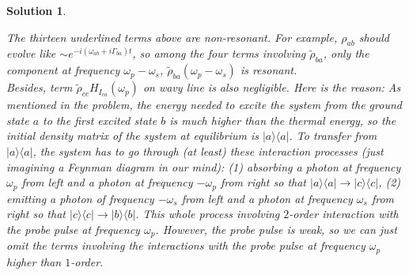 \documentclass[UTF8,10pt,a4paper]{article}
\theoremstyle{Problem}
\theoremstyle{Solution}
\newtheorem*{sol}{Solution}
\begin{document}
\begin{sol}
\begin{enumerate}
        \normalsize
        The thirteen underlined terms above are non-resonant. For example, $\rho_{ab}$ should evolve like $\sim e^{-i(\omega_{ab}+i\Gamma_{ba})t}$, so among the four terms involving $\tilde{\rho}_{ba}$, only the component at frequency $\omega_p-\omega_s$, $\tilde{\rho}_{ba}(\omega_p-\omega_s)$ is resonant.\\
        Besides, term $\tilde{\rho}_{cc}H_{I_{ca}}(\omega_p)$ on wavy line is also negligible. Here is the reason: As mentioned in the problem, the energy needed to excite the system from the ground state $a$ to the first excited state $b$ is much higher than the thermal energy, so the initial density matrix of the system at equilibrium is $\lvert a\rangle\langle a\rvert$. To transfer from $\lvert a\rangle\langle a\rvert$, the system has to go through (at least) these interaction processes (just imagining a Feynman diagram in our mind): (1) absorbing a photon at frequency $\omega_p$ from left and a photon at frequency $-\omega_p$ from right so that $\lvert a\rangle\langle a\rvert\longrightarrow\lvert c\rangle\langle c\rvert$, (2) emitting a photon of frequency $-\omega_s$ from left and a photon at frequency $\omega_s$ from right so that $\lvert c\rangle\langle c\rvert\longrightarrow\lvert b\rangle\langle b\rvert$. This whole process involving $2$-order interaction with the probe pulse at frequency $\omega_p$. However, the probe pulse is weak, so we can just omit the terms involving the interactions with the probe pulse at frequency $\omega_p$ higher than $1$-order.\\

\end{enumerate}
\end{sol}
\end{document}
